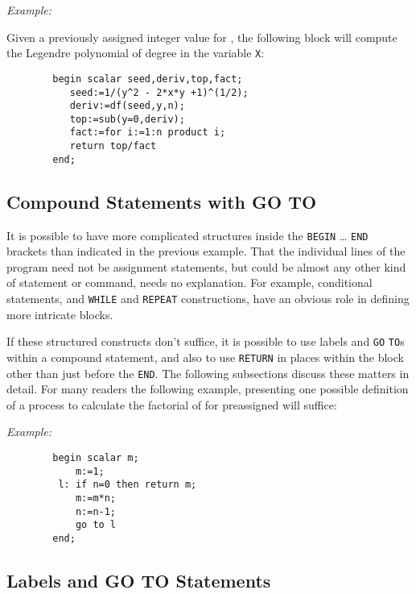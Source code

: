 \textit{Example:}

Given a previously assigned integer value for , the following block
will compute the Legendre polynomial of degree  in the variable
\texttt{X}:
\begin{verbatim}
        begin scalar seed,deriv,top,fact;
           seed:=1/(y^2 - 2*x*y +1)^(1/2);
           deriv:=df(seed,y,n);
           top:=sub(y=0,deriv);
           fact:=for i:=1:n product i;
           return top/fact
        end;
\end{verbatim}

\subsection{Compound Statements with GO TO}

It is possible to have more complicated structures inside the \texttt{BEGIN}
\ldots{} \texttt{END} brackets than indicated in the
previous example.  That the individual lines of the program need not be
assignment statements, but could be almost any other
kind of statement or command, needs no explanation.  For example,
conditional statements, and \texttt{WHILE} and \texttt{REPEAT}
 constructions, have an obvious role in defining more
intricate blocks.

If these structured constructs don't suffice, it is possible to use labels
 and \texttt{GO} \texttt{TO}s within a compound
statement, and also to use \texttt{RETURN}
 in places within the block other than just before the
\texttt{END}.  The following subsections discuss these matters in detail.
For many readers the following example, presenting one possible definition
of a process to calculate the factorial of  for preassigned 
will suffice:

\textit{Example:}
\begin{verbatim}
        begin scalar m;
            m:=1;
         l: if n=0 then return m;
            m:=m*n;
            n:=n-1;
            go to l
        end;
\end{verbatim}

\subsection{Labels and GO TO Statements}
\hypertarget{command:GOTO}{}

